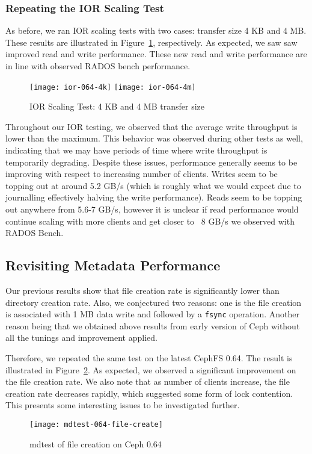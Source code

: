 \subsubsection{Repeating the IOR Scaling Test}

As before, we ran IOR scaling tests with two cases: transfer size 4 KB and 4
MB.  These results are illustrated in Figure~\ref{fig:ior-064}, respectively.
As expected, we saw saw  improved read and write performance. These new read
and write performance are in line with observed RADOS bench performance.


\begin{figure}[htb]
\centering
\texttt{[image: ior-064-4k]}
\texttt{[image: ior-064-4m]}
\caption{IOR Scaling Test: 4 KB and 4 MB transfer size}
\label{fig:ior-064}
\end{figure}

Throughout our IOR testing, we observed that the average write throughput is
lower than the maximum.  This behavior was observed during other tests as well,
indicating that we may have periods of time where write throughput is
temporarily degrading.  Despite these issues, performance generally seems to be
improving with respect to increasing number of clients.  Writes seem to be
topping out at around 5.2 GB/s (which is roughly what we would expect due to
journalling effectively halving the write performance).  Reads seem to be
topping out anywhere from 5.6-7 GB/s, however it is unclear if read performance
would continue scaling with more clients and get closer to ~8 GB/s we observed 
with RADOS Bench.

\subsection{Revisiting Metadata Performance}

Our previous results show that file creation rate is significantly lower than
directory creation rate. Also, we conjectured two reasons: one is the file
creation is associated with 1 MB data write and followed by a \verb!fsync!
operation.  Another reason being that we obtained above results from early
version of Ceph without all the tunings and improvement applied. 

Therefore, we repeated the same test on the latest CephFS 0.64. The result is
illustrated in Figure~\ref{fig:mdtest-064-file-create}. As expected, we
observed a significant improvement on the file creation rate. We also note
that as number of clients increase, the file creation rate decreases rapidly,
which suggested some form of lock contention. This presents some interesting
issues to be investigated further.

\begin{figure}[htb]
\centering
\texttt{[image: mdtest-064-file-create]}
\caption{mdtest of file creation on Ceph 0.64}
\label{fig:mdtest-064-file-create}
\end{figure}

